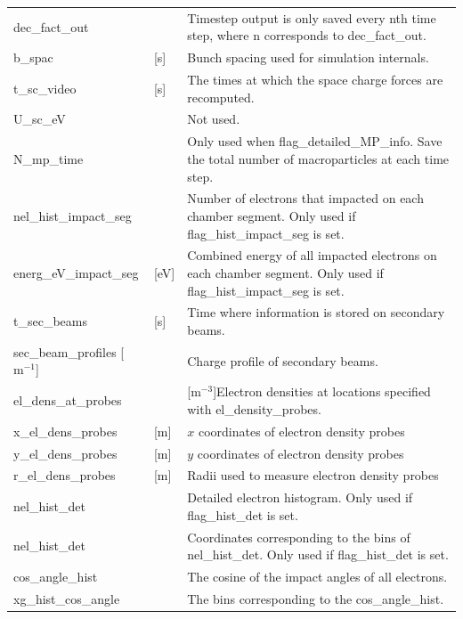 \documentclass[a4paper,12pt]{article}
\begin{document}
\begin{longtable}
    {p{}p{}p{}}
    \hline\endfirsthead\hline\endhead
    \rowcolor{Gray}\multicolumn{3}{p{.97\textwidth}}{
    \textbf{Other variables}}
    \\\hline
    dec\_fact\_out & & Timestep output is only saved every nth time step, where n corresponds to dec\_fact\_out.\\\hline
    b\_spac & [s] & Bunch spacing used for simulation internals. \\\hline
    t\_sc\_video & [s] & The times at which the space charge forces are recomputed. \\\hline
    U\_sc\_eV & & Not used. \\\hline
    N\_mp\_time &  & Only used when flag\_detailed\_MP\_info. Save the total number of macroparticles at each time step. \\\hline
    nel\_hist\_impact\_seg & & Number of electrons that impacted on each chamber segment. Only used if flag\_hist\_impact\_seg is set. \\\hline
    energ\_eV\_impact\_seg & [eV] & Combined energy of all impacted electrons on each chamber segment. Only used if flag\_hist\_impact\_seg is set. \\\hline
    t\_sec\_beams & [s] & Time where information is stored on secondary beams. \\\hline
    sec\_beam\_profiles [$\mathrm{m}^{-1}$]& & Charge profile of secondary beams. \\\hline
    el\_dens\_at\_probes & & [$\mathrm{m}^{-3}$]Electron densities at locations specified with el\_density\_probes. \\\hline
    x\_el\_dens\_probes & [m] & $x$ coordinates of electron density probes \\\hline
    y\_el\_dens\_probes & [m] & $y$ coordinates of electron density probes \\\hline
    r\_el\_dens\_probes & [m] & Radii used to measure electron density probes \\\hline
    nel\_hist\_det & & Detailed electron histogram. Only used if flag\_hist\_det is set. \\\hline
    nel\_hist\_det & & Coordinates corresponding to the bins of nel\_hist\_det. Only used if flag\_hist\_det is set. \\\hline
    cos\_angle\_hist & & The cosine of the impact angles of all electrons. \\\hline
    xg\_hist\_cos\_angle & & The bins corresponding to the cos\_angle\_hist. \\\hline
\end{longtable}
\end{document}
